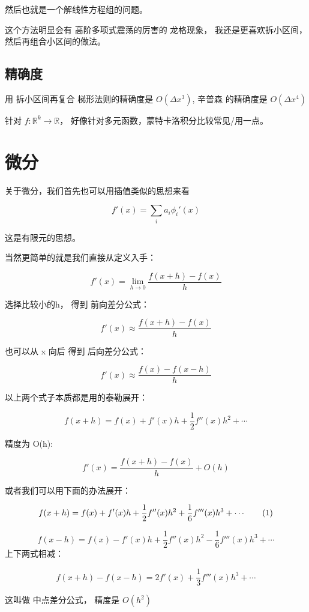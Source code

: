 \documentclass[
]{book}
\begin{document}
然后也就是一个解线性方程组的问题。

这个方法明显会有 高阶多项式震荡的厉害的 龙格现象， 我还是更喜欢拆小区间，然后再组合小区间的做法。

\hypertarget{ux7cbeux786eux5ea6}{%
\subsection{精确度}\label{ux7cbeux786eux5ea6}}

用 拆小区间再复合 梯形法则的精确度是 \(O(\Delta x^3)\), 辛普森 的精确度是 \(O(\Delta x^4)\)

针对 \(f: \mathbb{R}^k \to \mathbb{R}\)， 好像针对多元函数，蒙特卡洛积分比较常见/用一点。

\hypertarget{ux5faeux5206}{%
\section{微分}\label{ux5faeux5206}}

关于微分，我们首先也可以用插值类似的思想来看

\[
f'(x) = \sum_i a_i \phi_i'(x)
\]

这是有限元的思想。

当然更简单的就是我们直接从定义入手：

\[
f'(x) = \lim_{h \to 0} \frac{f(x+h) - f(x)}{h}
\]

选择比较小的h， 得到 前向差分公式：

\[
f'(x) \approx  \frac{f(x+h) - f(x)}{h}
\]

也可以从 x 向后 得到 后向差分公式：

\[
f'(x) \approx \frac{f(x) - f(x-h)}{h}
\]

以上两个式子本质都是用的泰勒展开：

\[
f(x+h) = f(x) + f'(x) h + \frac{1}{2} f''(x) h^2 + \cdots
\]

精度为 O(h):

\[
f'(x) = \frac{f(x+h) - f(x)}{h} + O(h)
\]

或者我们可以用下面的办法展开：

\[
f(x+h) = f(x) + f'(x) h + \frac{1}{2} f''(x) h^2 + \frac{1}{6}f'''(x)h^3 + \cdots  \tag{1}\\
\]

\[
f(x-h) = f(x) - f'(x) h + \frac{1}{2} f''(x) h^2 - \frac{1}{6}f'''(x)h^3 + \cdots  \tag{2}
\]
上下两式相减：

\[
f(x+h) - f(x -h) = 2f'(x) + \frac{1}{3}f'''(x)h^3 + \cdots 
\]

这叫做 中点差分公式， 精度是 \(O(h^2)\)
\end{document}
